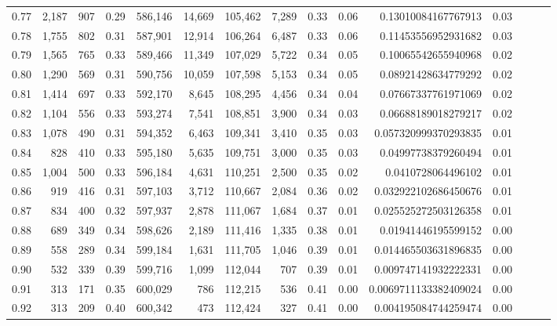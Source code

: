 \begin{tabular}{rrrrrrrrrrrrrrr}
0.77 &   2,187 &    907 &  0.29 &  586,146 &   14,669 &  105,462 &    7,289 &  0.33 &  0.06 &     0.13010084167767913 &      0.03 \\
0.78 &   1,755 &    802 &  0.31 &  587,901 &   12,914 &  106,264 &    6,487 &  0.33 &  0.06 &     0.11453556952931682 &      0.03 \\
0.79 &   1,565 &    765 &  0.33 &  589,466 &   11,349 &  107,029 &    5,722 &  0.34 &  0.05 &     0.10065542655940968 &      0.02 \\
0.80 &   1,290 &    569 &  0.31 &  590,756 &   10,059 &  107,598 &    5,153 &  0.34 &  0.05 &     0.08921428634779292 &      0.02 \\
0.81 &   1,414 &    697 &  0.33 &  592,170 &    8,645 &  108,295 &    4,456 &  0.34 &  0.04 &     0.07667337761971069 &      0.02 \\
0.82 &   1,104 &    556 &  0.33 &  593,274 &    7,541 &  108,851 &    3,900 &  0.34 &  0.03 &     0.06688189018279217 &      0.02 \\
0.83 &   1,078 &    490 &  0.31 &  594,352 &    6,463 &  109,341 &    3,410 &  0.35 &  0.03 &    0.057320999370293835 &      0.01 \\
0.84 &     828 &    410 &  0.33 &  595,180 &    5,635 &  109,751 &    3,000 &  0.35 &  0.03 &     0.04997738379260494 &      0.01 \\
0.85 &   1,004 &    500 &  0.33 &  596,184 &    4,631 &  110,251 &    2,500 &  0.35 &  0.02 &      0.0410728064496102 &      0.01 \\
0.86 &     919 &    416 &  0.31 &  597,103 &    3,712 &  110,667 &    2,084 &  0.36 &  0.02 &    0.032922102686450676 &      0.01 \\
0.87 &     834 &    400 &  0.32 &  597,937 &    2,878 &  111,067 &    1,684 &  0.37 &  0.01 &    0.025525272503126358 &      0.01 \\
0.88 &     689 &    349 &  0.34 &  598,626 &    2,189 &  111,416 &    1,335 &  0.38 &  0.01 &     0.01941446195599152 &      0.00 \\
0.89 &     558 &    289 &  0.34 &  599,184 &    1,631 &  111,705 &    1,046 &  0.39 &  0.01 &    0.014465503631896835 &      0.00 \\
0.90 &     532 &    339 &  0.39 &  599,716 &    1,099 &  112,044 &      707 &  0.39 &  0.01 &    0.009747141932222331 &      0.00 \\
0.91 &     313 &    171 &  0.35 &  600,029 &      786 &  112,215 &      536 &  0.41 &  0.00 &   0.0069711133382409024 &      0.00 \\
0.92 &     313 &    209 &  0.40 &  600,342 &      473 &  112,424 &      327 &  0.41 &  0.00 &    0.004195084744259474 &      0.00 \\

\end{tabular}
